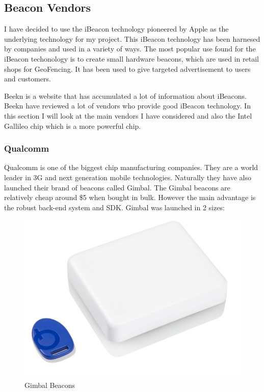 


\subsection{Beacon Vendors}

I have decided to use the iBeacon technology pioneered by Apple as
the underlying technology for my project. This iBeacon technology has been harnesed by companies and used in a variety of ways. The most popular use found for the iBeacon techonology is to create small hardware beacons, which are used in retail shops for GeoFencing. It has been used to give targeted advertisement to users and customers.

Beekn\cite{beekn} is a website that has accumulated a lot of information about iBeacons. Beekn have reviewed a lot of vendors who provide good iBeacon technology. In this section I will look at the main vendors I have
considered and also the Intel Gallileo chip which is a more powerful chip.


\subsubsection{Qualcomm}

Qualcomm\cite{quallcomm} is one of the biggest chip manufacturing
companies. They are a world leader in 3G and next generation mobile
technologies. Naturally they have also launched their brand of beacons
called Gimbal\cite{gimbal}. The Gimbal beacons are relatively cheap
around \$5 when bought in bulk. However the main advantage is the
robust back-end system and SDK. Gimbal was launched in 2 sizes:

\begin{figure}[H]
\includegraphics[scale=0.3]{images/gimbal-beacon}

\protect\caption{Gimbal Beacons}
\end{figure}

